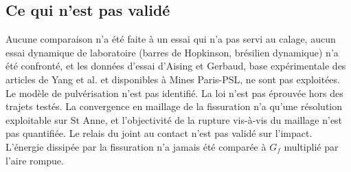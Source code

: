 \subsection{Ce qui n'est pas validé}

Aucune comparaison n'a été faite à un essai qui n'a pas servi au calage, aucun essai dynamique de laboratoire (barres de Hopkinson, brésilien dynamique) n'a été confronté, et les données d'essai d'Aising et Gerbaud, base expérimentale des articles de Yang et al. et disponibles à Mines Paris-PSL, ne sont pas exploitées. Le modèle de pulvérisation n'est pas identifié. La loi  n'est pas éprouvée hors des trajets testés. La convergence en maillage de la fissuration n'a qu'une résolution exploitable sur St Anne, et l'objectivité de la rupture vis-à-vis du maillage n'est pas quantifiée. Le relais du joint au contact n'est pas validé sur l'impact. L'énergie dissipée par la fissuration n'a jamais été comparée à $G_f$ multiplié par l'aire rompue.

